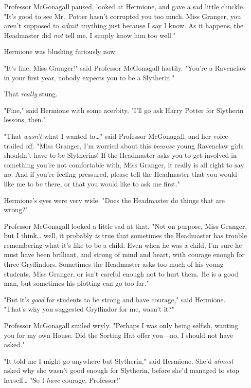 Professor McGonagall paused, looked at Hermione, and gave a sad little chuckle.
"It's good to see Mr.~Potter hasn't corrupted you too much. Miss Granger, you
aren't supposed to \emph{admit} anything just because I say I know. As it
happens, the Headmaster did \emph{not} tell me, I simply know him too well."

Hermione was blushing furiously now.

"It's fine, Miss Granger!" said Professor McGonagall hastily. "You're a
Ravenclaw in your first year, nobody expects you to be a Slytherin."

That \emph{really} stung.

"Fine," said Hermione with some acerbity, "I'll go ask Harry Potter for
Slytherin lessons, then."

"That \emph{wasn't} what I wanted to{\ldots}" said Professor McGonagall, and
her voice trailed off. "Miss Granger, I'm worried about this \emph{because}
young Ravenclaw girls shouldn't have to be Slytherins! If the Headmaster asks
you to get involved in something you're not comfortable with, Miss Granger, it
really is all right to say no. And if you're feeling pressured, please tell the
Headmaster that you would like me to be there, or that you would like to ask me
first."

Hermione's eyes were very wide. "Does the Headmaster do things that are wrong?"

Professor McGonagall looked a little sad at that. "Not on purpose, Miss
Granger, but I think{\ldots} well, it probably \emph{is} true that sometimes
the Headmaster has trouble remembering what it's like to be a child. Even when
he was a child, I'm sure he must have been brilliant, and strong of mind and
heart, with courage enough for three Gryffindors. Sometimes the Headmaster asks
too much of his young students, Miss Granger, or isn't careful enough not to
hurt them. He is a good man, but sometimes his plotting can go too far."

"But it's \emph{good} for students to be strong and have courage," said
Hermione. "That's why you suggested Gryffindor for me, wasn't it?"

Professor McGonagall smiled wryly. "Perhaps I was only being selfish, wanting
you for my own House. Did the Sorting Hat offer you---no, I should not have
asked."

"It told me I might go anywhere but Slytherin," said Hermione. She'd
\emph{almost} asked why she wasn't good enough for Slytherin, before she'd
managed to stop herself{\ldots} "So I \emph{have} courage, Professor!"

